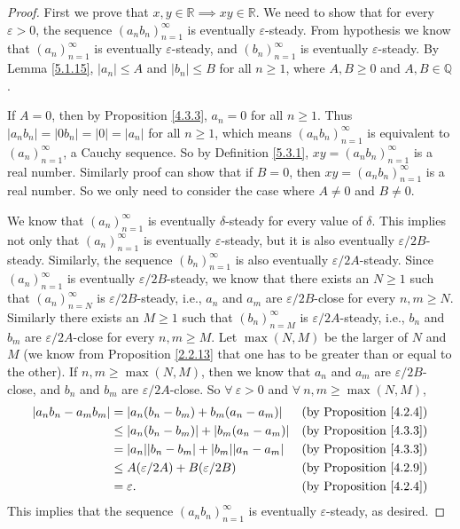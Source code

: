 \begin{proof}
First we prove that \(x, y \in \mathds{R} \implies xy \in \mathds{R}\).
We need to show that for every \(\varepsilon > 0\), the sequence \((a_n b_n)_{n = 1}^{\infty}\) is eventually \(\varepsilon\)-steady.
From hypothesis we know that \((a_n)_{n = 1}^{\infty}\) is eventually \(\varepsilon\)-steady, and \((b_n)_{n = 1}^{\infty}\) is eventually \(\varepsilon\)-steady.
By Lemma \ref{5.1.15}, \(|a_n| \leq A\) and \(|b_n| \leq B\) for all \(n \geq 1\), where \(A, B \geq 0\) and \(A, B \in \mathds{Q}\).

If \(A = 0\), then by Proposition \ref{4.3.3}, \(a_n = 0\) for all \(n \geq 1\).
Thus \(|a_n b_n| = |0b_n| = |0| = |a_n|\) for all \(n \geq 1\), which means \((a_n b_n)_{n = 1}^{\infty}\) is equivalent to \((a_n)_{n = 1}^{\infty}\), a Cauchy sequence.
So by Definition \ref{5.3.1}, \(xy = (a_n b_n)_{n = 1}^{\infty}\) is a real number.
Similarly proof can show that if \(B = 0\), then \(xy = (a_n b_n)_{n = 1}^{\infty}\) is a real number.
So we only need to consider the case where \(A \neq 0\) and \(B \neq 0\).

We know that \((a_n)_{n = 1}^{\infty}\) is eventually \(\delta\)-steady for every value of \(\delta\).
This implies not only that \((a_n)_{n = 1}^{\infty}\) is eventually \(\varepsilon\)-steady, but it is also eventually \(\varepsilon / 2B\)-steady.
Similarly, the sequence \((b_n)_{n = 1}^{\infty}\) is also eventually \(\varepsilon / 2A\)-steady.
Since \((a_n)_{n = 1}^{\infty}\) is eventually \(\varepsilon / 2B\)-steady, we know that there exists an \(N \geq 1\) such that \((a_n)_{n = N}^{\infty}\) is \(\varepsilon / 2B\)-steady, i.e., \(a_n\) and \(a_m\) are \(\varepsilon / 2B\)-close for every \(n, m \geq N\).
Similarly there exists an \(M \geq 1\) such that \((b_n)_{n = M}^{\infty}\) is \(\varepsilon / 2A\)-steady, i.e., \(b_n\) and \(b_m\) are \(\varepsilon / 2A\)-close for every \(n, m \geq M\).
Let \(\max(N, M)\) be the larger of \(N\) and \(M\)
(we know from Proposition \ref{2.2.13} that one has to be greater than or equal to the other).
If \(n, m \geq \max(N, M)\), then we know that \(a_n\) and \(a_m\) are \(\varepsilon / 2B\)-close, and \(b_n\) and \(b_m\) are \(\varepsilon / 2A\)-close.
So \(\forall\ \varepsilon > 0\) and \(\forall\ n, m \geq \max(N, M)\),
\begin{align*}
|a_n b_n - a_m b_m| &= |a_n (b_n - b_m) + b_m (a_n - a_m)| & \text{(by Proposition \ref{4.2.4})} \\
&\leq |a_n (b_n - b_m)| + |b_m (a_n - a_m)| & \text{(by Proposition \ref{4.3.3})} \\
&= |a_n||b_n - b_m| + |b_m||a_n - a_m| & \text{(by Proposition \ref{4.3.3})} \\
&\leq A(\varepsilon / 2A) + B(\varepsilon / 2B) & \text{(by Proposition \ref{4.2.9})} \\
&= \varepsilon. & \text{(by Proposition \ref{4.2.4})}
\end{align*}
This implies that the sequence \((a_n b_n)_{n = 1}^{\infty}\) is eventually \(\varepsilon\)-steady, as desired.


\end{proof}
